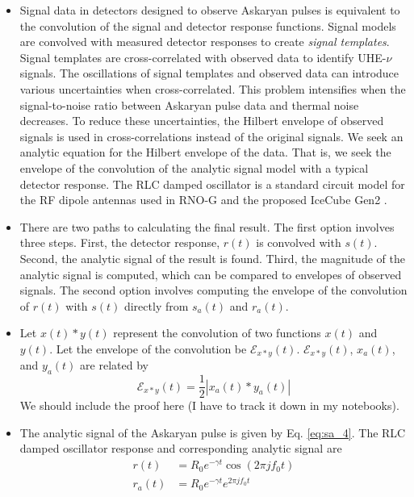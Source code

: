 \documentclass[amsmath,amssymb,aps,prd,10pt,twocolumn,showkeys]{revtex4}
\begin{document}
\begin{itemize}
\item Signal data in detectors designed to observe Askaryan pulses is equivalent to the convolution of the signal and detector response functions.  Signal models are convolved with measured detector responses to create \textit{signal templates}.  Signal templates are cross-correlated with observed data to identify UHE-$\nu$ signals.  The oscillations of signal templates and observed data can introduce various uncertainties when cross-correlated.  This problem intensifies when the signal-to-noise ratio between Askaryan pulse data and thermal noise decreases.  To reduce these uncertainties, the Hilbert envelope of observed signals is used in cross-correlations instead of the original signals.  We seek an analytic equation for the Hilbert envelope of the data.  That is, we seek the envelope of the convolution of the analytic signal model with a typical detector response.  The RLC damped oscillator is a standard circuit model for the RF dipole antennas used in RNO-G and the proposed IceCube Gen2 \cite{10.1103/PhysRevD.85.062004,10.1088/1748-0221/16/03/p03025,10.48550/arxiv.2008.04323}.
\item There are two paths to calculating the final result.  The first option involves three steps.  First, the detector response, $r(t)$ is convolved with $s(t)$.  Second, the analytic signal of the result is found.  Third, the magnitude of the analytic signal is computed, which can be compared to envelopes of observed signals.  The second option involves computing the envelope of the convolution of $r(t)$ with $s(t)$ directly from $s_a(t)$ and $r_a(t)$.
\item Let $x(t) * y(t)$ represent the convolution of two functions $x(t)$ and $y(t)$.  Let the envelope of the convolution be $\mathcal{E}_{x * y}(t)$.  $\mathcal{E}_{x * y}(t)$, $x_a(t)$, and $y_a(t)$ are related by
\begin{equation}
\mathcal{E}_{x * y}(t) = \frac{1}{2}| x_a (t) * y_a(t)| \label{eq:awesome}
\end{equation}
We should include the proof here (I have to track it down in my notebooks).
\item The analytic signal of the Askaryan pulse is given by Eq. \ref{eq:sa_4}.  The RLC damped oscillator response and corresponding analytic signal are
\begin{align}
r(t) &= R_0 e^{-\gamma t} \cos(2\pi j f_0 t) \\
r_a(t) &= R_0 e^{-\gamma t} e^{2\pi j f_0 t} \label{eq:ra}
\end{align}

\end{itemize}
\end{document}
